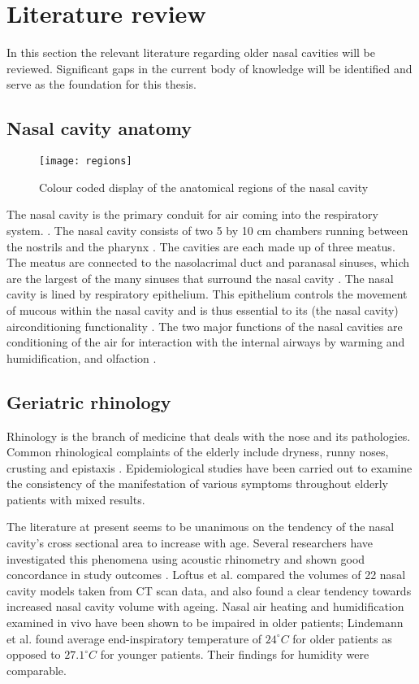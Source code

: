\section{Literature review}
In this section the relevant literature regarding older nasal cavities will be reviewed. Significant gaps in the current body of knowledge will be identified and serve as the foundation for this thesis.

\subsection{Nasal cavity anatomy}


\begin{figure}
\centering
\texttt{[image: regions]}
\caption{Colour coded display of the anatomical regions of the nasal cavity} 
\label{fig:regions1}
\end{figure} 


The nasal cavity is the primary conduit for air coming into the respiratory system. \cite{Elad2008}. The nasal cavity consists of two 5 by 10 cm chambers running between the nostrils and the pharynx \cite{Mygind1998}. The cavities are each made up of three meatus. The meatus are connected to the nasolacrimal duct and paranasal sinuses, which are the largest of the many sinuses that surround the nasal cavity \cite{Mygind1998}. 
The nasal cavity is lined by respiratory epithelium. This epithelium controls the movement of mucous within the nasal cavity and is thus essential to its (the nasal cavity) airconditioning functionality \cite{Mygind1998}.
The two major functions of the nasal cavities are conditioning of the air for interaction with the internal airways by warming and humidification, and olfaction \cite{Doorly2008, Elad2008, Mygind1998, Berglund1982}.

\subsection{Geriatric rhinology}
Rhinology is the branch of medicine that deals with the nose and its pathologies. 
Common rhinological complaints of the elderly include dryness, runny noses, crusting and epistaxis \cite{Varga-Huettner2013}. Epidemiological studies have been carried out to examine the consistency of the manifestation of various symptoms throughout elderly patients with mixed results. 

The literature at present seems to be unanimous on the tendency of the nasal cavity's cross sectional area to increase with age. Several researchers have investigated this phenomena using acoustic rhinometry and shown good concordance in study outcomes \cite{Kalmovich2005, Edelstein1996,WhanKim2007,Lindemann2008}. Loftus et al. \cite{Loftus2016} compared the volumes of 22 nasal cavity models taken from CT scan data, and also found a clear tendency towards increased nasal cavity volume with ageing. Nasal air heating and humidification examined in vivo have been shown to be impaired in older patients; Lindemann et al. \cite{Lindemann2008} found average end-inspiratory temperature of $24^{\circ}C$ for older  patients as opposed to $27.1^{\circ}C$ for younger patients. Their findings for humidity were comparable. 

